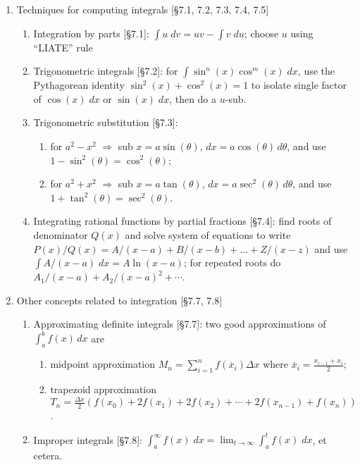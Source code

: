 \documentclass[11pt]{article}
\begin{document}
\begin{enumerate}
\item Techniques for computing integrals [\S7.1, 7.2, 7.3, 7.4, 7.5]
\begin{enumerate}
\item Integration by parts [\S7.1]: $\int u \; dv = uv - \int v \; du$; choose $u$ using ``LIATE'' rule
\item Trigonometric integrals [\S7.2]: for $\int \sin^n(x) \cos^m(x) \; dx$, use the Pythagorean identity $\sin^2(x) + \cos^2(x)=1$ to isolate single factor of $\cos(x) \; dx$ or $\sin(x) \; dx$, then do a $u$-sub.
\item Trigonometric substitution [\S7.3]: 
\begin{enumerate}
\item for $a^2-x^2$ $\Rightarrow$ sub $x = a\sin(\theta)$, $dx = a\cos(\theta) \, d\theta$, and use $1-\sin^2(\theta) = \cos^2(\theta)$;
\item for $a^2+x^2$ $\Rightarrow$ sub $x = a\tan(\theta)$, $dx = a\sec^2(\theta) \, d\theta$, and use $1+\tan^2(\theta) = \sec^2(\theta)$.
\end{enumerate}
\item Integrating rational functions by partial fractions [\S7.4]: find roots of denominator $Q(x)$ and solve system of equations to write $P(x)/Q(x) = A/(x-a) + B/(x-b) + ...  + Z/(x-z)$ and use $\int A/(x-a) \;dx = A \ln(x-a)$; for repeated roots do $A_1/(x-a) + A_2/(x-a)^2 + \cdots$.
\end{enumerate}

\item Other concepts related to integration [\S7.7, 7.8]
\begin{enumerate}
\item Approximating definite integrals [\S7.7]: two good approximations of $\int_{a}^{b} f(x) \, dx$ are
\begin{enumerate}
\item midpoint approximation $M_n = \sum_{i=1}^{n} f(\overline{x}_i) \Delta x$ where $\overline{x}_i = \frac{x_{i-1}+x_i}{2}$;
\item trapezoid approximation $T_n = \frac{\Delta x}{2} (f(x_0)+2f(x_1) + 2f(x_2) + \cdots + 2f(x_{n-1}) + f(x_n) )$.
\end{enumerate}
\item Improper integrals [\S7.8]: $\int_{a}^{\infty} f(x) \; dx = \lim_{t\to \infty} \int_a^t f(x) \; dx$, et cetera.
\end{enumerate}

\end{enumerate}
\end{document}
